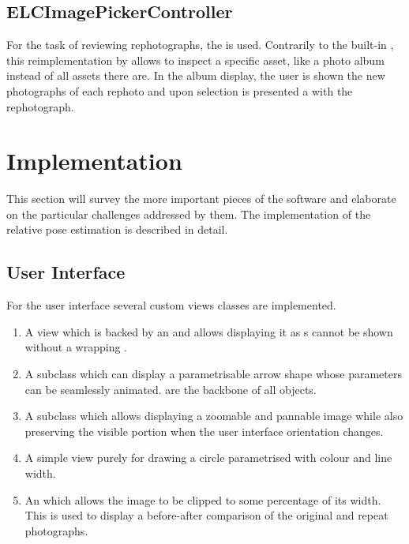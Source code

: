 \subsection{ELCImagePickerController}

For the task of reviewing rephotographs, the  is
used. Contrarily to the built-in , this
reimplementation by \citet{nutting2013} allows to inspect a specific asset, like
a photo album instead of all assets there are. In the album display, the user is
shown the new photographs of each rephoto and upon selection is presented a
 with the rephotograph.


\section{Implementation}

This section will survey the more important pieces of the software and elaborate
on the particular challenges addressed by them. The implementation of the
relative pose estimation is described in detail.

\subsection{User Interface}

For the user interface several custom views classes are implemented.
\begin{enumerate}
   \item {} A view which is backed by an  and
      allows displaying it as s cannot be shown without a
      wrapping .
   \item {} A  subclass which can display a
      parametrisable arrow shape whose parameters can be seamlessly animated.
       are the backbone of all  objects.
   \item {} A  subclass which allows
      displaying a zoomable and pannable image while also preserving the visible
      portion when the user interface orientation changes.
   \item {} A simple view purely for drawing a circle parametrised
      with colour and line width.
   \item {} An  which allows the
      image to be clipped to some percentage of its width. This is used to
      display a before-after comparison of the original and repeat photographs.
\end{enumerate}

